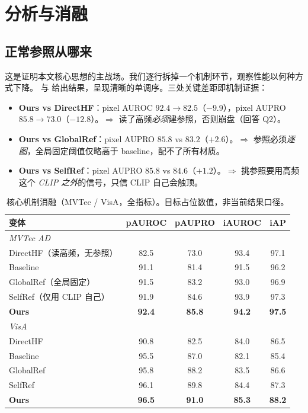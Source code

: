 \section{分析与消融}
\label{sec:analysis}

\subsection{正常参照从哪来}
这是证明本文核心思想的主战场。我们逐行拆掉一个机制环节，观察性能以何种方式下降。 与  给出结果，呈现清晰的单调序。三处关键差距即机制证据：
\begin{itemize}[leftmargin=1.4em,itemsep=0.1em,topsep=0.2em]
\item \textbf{Ours vs DirectHF}：pixel AUROC $92.4\!\to\!82.5$（$-9.9$），pixel AUPRO $85.8\!\to\!73.0$（$-12.8$）。$\Rightarrow$ 读了高频\emph{必须}建参照，否则崩盘（回答 Q2）。
\item \textbf{Ours vs GlobalRef}：pixel AUPRO $85.8$ vs $83.2$（$+2.6$）。$\Rightarrow$ 参照必须\emph{逐图}，全局固定阈值仅略高于 baseline，配不了所有材质。
\item \textbf{Ours vs SelfRef}：pixel AUPRO $85.8$ vs $84.6$（$+1.2$）。$\Rightarrow$ 挑参照要用高频这个 \emph{CLIP 之外}的信号，只信 CLIP 自己会触顶。
\end{itemize}

\begin{table}[t]
\centering
\caption{核心机制消融（MVTec / VisA，全指标）。目标占位数值，非当前结果口径。}
\label{tab:ablation}
\small
\setlength{\tabcolsep}{4pt}
\begin{tabular}{lcccc}
\toprule
变体 & pAUROC & pAUPRO & iAUROC & iAP \\
\midrule
\multicolumn{5}{l}{\emph{MVTec AD}}\\
DirectHF（读高频，无参照） & 82.5 & 73.0 & 93.4 & 97.1 \\
Baseline & 91.1 & 81.4 & 91.5 & 96.2 \\
GlobalRef（全局固定） & 91.5 & 83.2 & 93.0 & 96.9 \\
SelfRef（仅用 CLIP 自己） & 91.9 & 84.6 & 93.9 & 97.3 \\
\textbf{Ours} & \textbf{92.4} & \textbf{85.8} & \textbf{94.2} & \textbf{97.5} \\
\midrule
\multicolumn{5}{l}{\emph{VisA}}\\
DirectHF & 90.8 & 82.5 & 84.0 & 86.5 \\
Baseline & 95.5 & 87.0 & 82.1 & 85.4 \\
GlobalRef & 95.8 & 88.2 & 83.5 & 86.6 \\
SelfRef & 96.1 & 89.8 & 84.4 & 87.3 \\
\textbf{Ours} & \textbf{96.5} & \textbf{91.0} & \textbf{85.3} & \textbf{88.2} \\
\bottomrule
\end{tabular}
\end{table}

